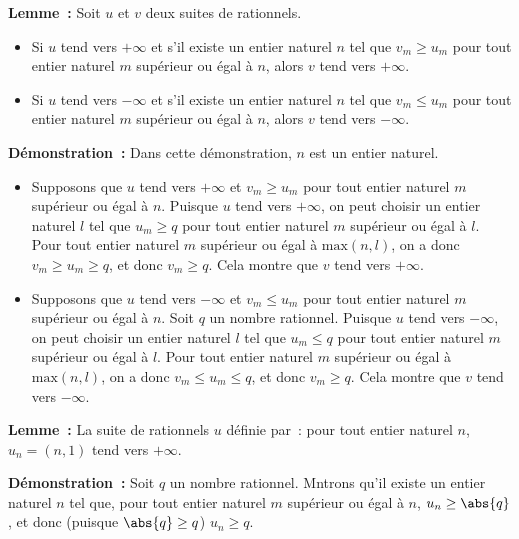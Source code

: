     \done

\medskip

\noindent\textbf{Lemme :} Soit $u$ et $v$ deux suites de rationnels.
    \begin{itemize}[nosep]
        \item Si $u$ tend vers $+\infty$ et s'il existe un entier naturel $n$ tel que $v_m \geq u_m$ pour tout entier naturel $m$ supérieur ou égal à $n$, alors $v$ tend vers $+\infty$.
        \item Si $u$ tend vers $-\infty$ et s'il existe un entier naturel $n$ tel que $v_m \leq u_m$ pour tout entier naturel $m$ supérieur ou égal à $n$, alors $v$ tend vers $-\infty$.
    \end{itemize}

\medskip

\noindent\textbf{Démonstration :} 
    Dans cette démonstration, $n$ est un entier naturel.
    \begin{itemize}[nosep]
        \item Supposons que $u$ tend vers $+\infty$ et $v_m \geq u_m$ pour tout entier naturel $m$ supérieur ou égal à $n$.
            Puisque $u$ tend vers $+\infty$, on peut choisir un entier naturel $l$ tel que $u_m \geq q$ pour tout entier naturel $m$ supérieur ou égal à $l$.
            Pour tout entier naturel $m$ supérieur ou égal à $\mathrm{max}(n,l)$, on a donc $v_m \geq u_m \geq q$, et donc $v_m \geq q$.
            Cela montre que $v$ tend vers $+\infty$.
        \item Supposons que $u$ tend vers $-\infty$ et $v_m \leq u_m$ pour tout entier naturel $m$ supérieur ou égal à $n$.
            Soit $q$ un nombre rationnel.
            Puisque $u$ tend vers $-\infty$, on peut choisir un entier naturel $l$ tel que $u_m \leq q$ pour tout entier naturel $m$ supérieur ou égal à $l$.
            Pour tout entier naturel $m$ supérieur ou égal à $\mathrm{max}(n,l)$, on a donc $v_m \leq u_m \leq q$, et donc $v_m \geq q$.
            Cela montre que $v$ tend vers $-\infty$.
    \end{itemize}

    \done

\medskip

\noindent\textbf{Lemme :} La suite de rationnels $u$ définie par : pour tout entier naturel $n$, $u_n = (n, 1)$ tend vers $+\infty$. 

\medskip

\noindent\textbf{Démonstration :} Soit $q$ un nombre rationnel.
    Mntrons qu'il existe un entier naturel $n$ tel que, pour tout entier naturel $m$ supérieur ou égal à $n$, $u_n \geq \abs{q}$, et donc (puisque $\abs{q} \geq q$) $u_n \geq q$.


